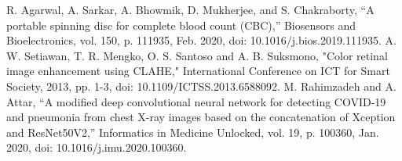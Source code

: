 \documentclass[conference]{IEEEtran}
\begin{document}
\begin{thebibliography}{00}
 R. Agarwal, A. Sarkar, A. Bhowmik, D. Mukherjee, and S. Chakraborty, “A portable spinning disc for complete blood count (CBC),” Biosensors and Bioelectronics, vol. 150, p. 111935, Feb. 2020, doi: 10.1016/j.bios.2019.111935.
 A. W. Setiawan, T. R. Mengko, O. S. Santoso and A. B. Suksmono, "Color retinal image enhancement using CLAHE," International Conference on ICT for Smart Society, 2013, pp. 1-3, doi: 10.1109/ICTSS.2013.6588092.
 M. Rahimzadeh and A. Attar, “A modified deep convolutional neural network for detecting COVID-19 and pneumonia from chest X-ray images based on the concatenation of Xception and ResNet50V2,” Informatics in Medicine Unlocked, vol. 19, p. 100360, Jan. 2020, doi: 10.1016/j.imu.2020.100360.
\end{thebibliography}
\vspace{12pt}
\color{red}
\end{document}
